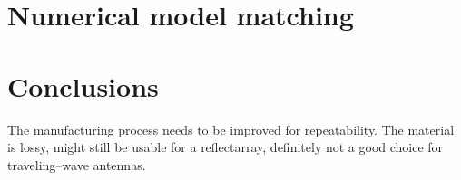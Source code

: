 \documentclass[11pt,a4paper]{article}
\begin{document}
    \section{Numerical model matching}
    \label{sec:numerical-model-matching}



    \section{Conclusions}
    \label{sec:conclusion}
    The manufacturing process needs to be improved for repeatability.
    The material is lossy, might still be usable for a reflectarray, definitely not a good choice for traveling--wave antennas.

    \clearpage
    
    
\end{document}
